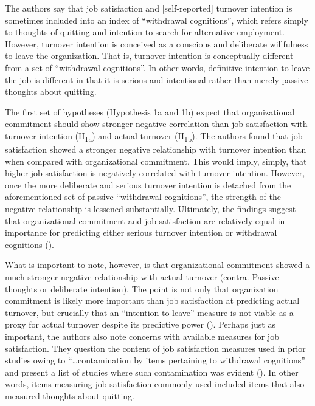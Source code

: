 \documentclass[
  11pt,
  a4paper,
]{article}
\begin{document}
The authors say that job satisfaction and {[}self-reported{]} turnover
intention is sometimes included into an index of ``withdrawal
cognitions'', which refers simply to thoughts of quitting and intention
to search for alternative employment. However, turnover intention is
conceived as a conscious and deliberate willfulness to leave the
organization. That is, turnover intention is conceptually different from
a set of ``withdrawal cognitions''. In other words, definitive intention
to leave the job is different in that it is serious and intentional
rather than merely passive thoughts about quitting.

The first set of hypotheses (Hypothesis 1a and 1b) expect that
organizational commitment should show stronger negative correlation than
job satisfaction with turnover intention (H\textsubscript{1a}) and
actual turnover (H\textsubscript{1b}). The authors found that job
satisfaction showed a stronger negative relationship with turnover
intention than when compared with organizational commitment. This would
imply, simply, that higher job satisfaction is negatively correlated
with turnover intention. However, once the more deliberate and serious
turnover intention is detached from the aforementioned set of passive
``withdrawal cognitions'', the strength of the negative relationship is
lessened substantially. Ultimately, the findings suggest that
organizational commitment and job satisfaction are relatively equal in
importance for predicting either serious turnover intention or
withdrawal cognitions ().

What is important to note, however, is that organizational commitment
showed a much stronger negative relationship with actual turnover
(contra. Passive thoughts or deliberate intention). The point is not
only that organization commitment is likely more important than job
satisfaction at predicting actual turnover, but crucially that an
``intention to leave'' measure is not viable as a proxy for actual
turnover despite its predictive power (). Perhaps just as important, the authors also note concerns
with available measures for job satisfaction. They question the content
of job satisfaction measures used in prior studies owing to
``\ldots contamination by items pertaining to withdrawal cognitions''
and present a list of studies where such contamination was evident
(). In other words,
items measuring job satisfaction commonly used included items that also
measured thoughts about quitting.
\end{document}
